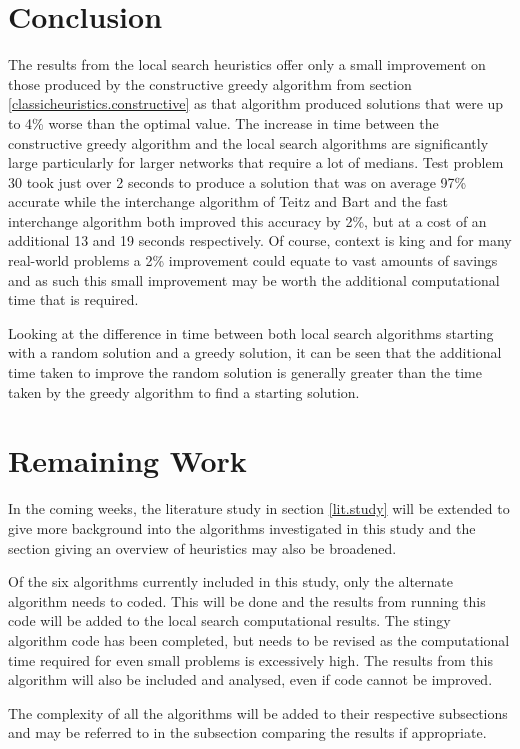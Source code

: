 \documentclass[11pt]{article}
\begin{document}
	\section{Conclusion} \label{conclusion}
	The results from the local search heuristics offer only a small improvement on those produced by the constructive greedy algorithm from section \ref{classicheuristics.constructive} as that algorithm produced solutions that were up to 4\% worse than the optimal value.  The increase in time between the constructive greedy algorithm and the local search algorithms are significantly large particularly for larger networks that require a lot of medians.  Test problem 30 took just over 2 seconds to produce a solution that was on average 97\% accurate while the interchange algorithm of Teitz and Bart and the fast interchange algorithm both improved this accuracy by 2\%, but at a cost of an additional 13 and 19 seconds respectively.  Of course, context is king and for many real-world problems a 2\% improvement could equate to vast amounts of savings and as such this small improvement may be worth the additional computational time that is required.
	
	Looking at the difference in time between both local search algorithms starting with a random solution and a greedy solution, it can be seen that the additional time taken to improve the random solution is generally greater than the time taken by the greedy algorithm to find a starting solution.
	
	
	\section{Remaining Work}
	In the coming weeks, the literature study in section \ref{lit.study} will be extended to give more background into the algorithms investigated in this study and the section giving an overview of heuristics may also be broadened.
	
	Of the six algorithms currently included in this study, only the alternate algorithm needs to coded.  This will be done and the results from running this code will be added to the local search computational results.  The stingy algorithm code has been completed, but needs to be revised as the computational time required for even small problems is excessively high.  The results from this algorithm will also be included and analysed, even if code cannot be improved.
	
	The complexity of all the algorithms will be added to their respective subsections and may be referred to in the subsection comparing the results if appropriate.
	
\end{document}
